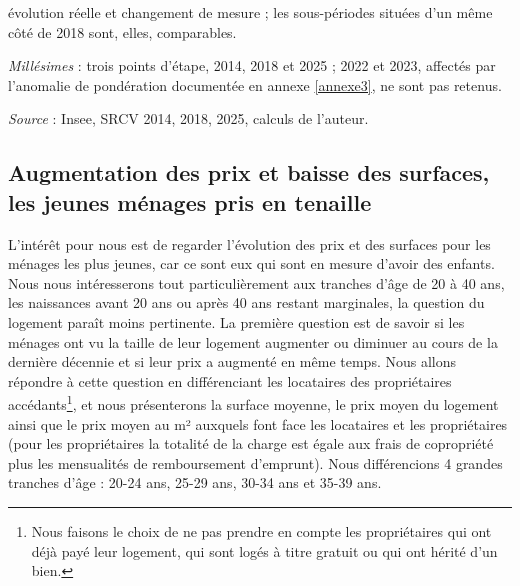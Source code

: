 \documentclass[12pt,a4paper]{article}
\begin{document}
\begin{table}[h!]
\begin{threeparttable}
\begin{tablenotes}[flushleft]
			évolution réelle et changement de mesure ; les sous-périodes situées d'un même côté
			de 2018 sont, elles, comparables.
			\item \textit{Millésimes} : trois points d'étape, 2014, 2018 et 2025 ; 2022 et 2023, affectés par l'anomalie de pondération
			documentée en annexe \ref{annexe3}, ne sont pas retenus.
			\item \textit{Source} : Insee, SRCV 2014, 2018, 2025, calculs de l'auteur.
		\end{tablenotes}
	\end{threeparttable}
\end{table}




\newpage

\subsection{Augmentation des prix et baisse des surfaces, les jeunes ménages pris en tenaille}

L’intérêt pour nous est de regarder l’évolution des prix et des surfaces pour les ménages les plus jeunes, car ce sont eux qui sont en mesure d’avoir des enfants. Nous nous intéresserons tout particulièrement aux tranches d’âge de 20 à 40 ans, les naissances avant 20 ans ou après 40 ans restant marginales, la question du logement paraît moins pertinente. La première question est de savoir si les ménages ont vu la taille de leur logement augmenter ou diminuer au cours de la dernière décennie et si leur prix a augmenté en même temps. Nous allons répondre à cette question en différenciant les locataires des propriétaires accédants\footnote{Nous faisons le choix de ne pas prendre en compte les propriétaires qui ont déjà payé leur logement, qui sont logés à titre gratuit ou qui ont hérité d’un bien.}, et nous présenterons la surface moyenne, le prix moyen du logement ainsi que le prix moyen au m² auxquels font face les locataires et les propriétaires (pour les propriétaires la totalité de la charge est égale aux frais de copropriété plus les mensualités de remboursement d’emprunt). Nous différencions 4 grandes tranches d’âge : 20-24 ans, 25-29 ans, 30-34 ans et 35-39 ans. \\
\end{document}
